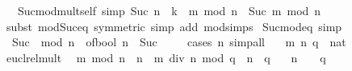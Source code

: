 \begin{isabellebody}
\ \ \ Suc{\isacharunderscore}{\kern0pt}mod{\isacharunderscore}{\kern0pt}mult{\isacharunderscore}{\kern0pt}self{}\ {\isacharbrackleft}{\kern0pt}simp{\isacharbrackright}{\kern0pt}{\isacharcolon}{\kern0pt}\ {\isachardoublequoteopen}Suc\ {\isacharparenleft}{\kern0pt}n\ {\isacharasterisk}{\kern0pt}\ k\ {\isacharplus}{\kern0pt}\ m{\isacharparenright}{\kern0pt}\ mod\ n\ {\isacharequal}{\kern0pt}\ Suc\ m\ mod\ n{\isachardoublequoteclose}\isanewline
%
\isadelimproof
\ \ %
\endisadelimproof
%
\isatagproof
{}\isamarkupfalse%
\ {\isacharparenleft}{\kern0pt}subst\ mod{\isacharunderscore}{\kern0pt}Suc{\isacharunderscore}{\kern0pt}eq\ {\isacharbrackleft}{\kern0pt}symmetric{\isacharbrackright}{\kern0pt}{\isacharcomma}{\kern0pt}\ simp\ add{\isacharcolon}{\kern0pt}\ mod{\isacharunderscore}{\kern0pt}simps{\isacharparenright}{\kern0pt}{\isacharplus}{\kern0pt}%
\endisatagproof
{\isafoldproof}%
%
\isadelimproof
\isanewline
%
\endisadelimproof
\isanewline
{}\isamarkupfalse%
\ Suc{\isacharunderscore}{\kern0pt}{}{\isacharunderscore}{\kern0pt}mod{\isacharunderscore}{\kern0pt}eq\ {\isacharbrackleft}{\kern0pt}simp{\isacharbrackright}{\kern0pt}{\isacharcolon}{\kern0pt}\isanewline
\ \ {\isachardoublequoteopen}Suc\ {}\ mod\ n\ {\isacharequal}{\kern0pt}\ of{\isacharunderscore}{\kern0pt}bool\ {\isacharparenleft}{\kern0pt}n\ {\isasymnoteq}\ Suc\ {}{\isacharparenright}{\kern0pt}{\isachardoublequoteclose}\isanewline
%
\isadelimproof
\ \ %
\endisadelimproof
%
\isatagproof
{}\isamarkupfalse%
\ {\isacharparenleft}{\kern0pt}cases\ n{\isacharparenright}{\kern0pt}\ simp{\isacharunderscore}{\kern0pt}all%
\endisatagproof
{\isafoldproof}%
%
\isadelimproof
\isanewline
%
\endisadelimproof
\isanewline
{}\isamarkupfalse%
\isanewline
\ \ \ m\ n\ q\ {\isacharcolon}{\kern0pt}{\isacharcolon}{\kern0pt}\ nat\isanewline
{}\isanewline
\isanewline
{}\ \isamarkupfalse%
\ eucl{\isacharunderscore}{\kern0pt}rel{\isacharunderscore}{\kern0pt}mult{}{\isacharcolon}{\kern0pt}\isanewline
\ \ {\isachardoublequoteopen}m\ mod\ n\ {\isacharplus}{\kern0pt}\ n\ {\isacharasterisk}{\kern0pt}\ {\isacharparenleft}{\kern0pt}m\ div\ n\ mod\ q{\isacharparenright}{\kern0pt}\ {\isacharless}{\kern0pt}\ n\ {\isacharasterisk}{\kern0pt}\ q{\isachardoublequoteclose}\isanewline
\ \ \ {\isachardoublequoteopen}n\ {\isachargreater}{\kern0pt}\ {}{\isachardoublequoteclose}\ \ {\isachardoublequoteopen}q\ {\isachargreater}{\kern0pt}\ {}{\isachardoublequoteclose}\isanewline

\end{isabellebody}
